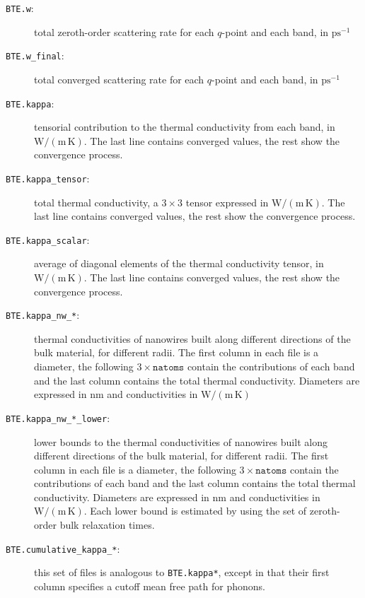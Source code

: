 \documentclass[a4paper,10pt,english]{article}
\begin{document}
\begin{description}
\item[\texttt{BTE.w}:] total zeroth-order scattering rate for each $q$-point and each band, in $\mathrm{ps^{-1}}$
\item[\texttt{BTE.w\_final}:] total converged scattering rate for each $q$-point and each band, in $\mathrm{ps^{-1}}$
\item[\texttt{BTE.kappa}:] tensorial contribution to the thermal conductivity from each band, in $\mathrm{W/\left(m\,K\right)}$. The last line contains converged values, the rest show the convergence process.
\item[\texttt{BTE.kappa\_tensor}:] total thermal conductivity, a $3\times 3$ tensor expressed in $\mathrm{W/\left(m\,K\right)}$. The last line contains converged values, the rest show the convergence process.
\item[\texttt{BTE.kappa\_scalar}:] average of diagonal elements of the thermal conductivity tensor, in $\mathrm{W/\left(m\,K\right)}$. The last line contains converged values, the rest show the convergence process.
\item[\texttt{BTE.kappa\_nw\_*}:] thermal conductivities of nanowires built along different directions of the bulk material, for different radii. The first column in each file is a diameter, the following $3\times\mathtt{natoms}$ contain the contributions of each band and the last column contains the total thermal conductivity. Diameters are expressed in $\mathrm{nm}$ and conductivities in $\mathrm{W/\left(m\,K\right)}$
\item[\texttt{BTE.kappa\_nw\_*\_lower}:] lower bounds to the thermal conductivities of nanowires built along different directions of the bulk material, for different radii. The first column in each file is a diameter, the following $3\times\mathtt{natoms}$ contain the contributions of each band and the last column contains the total thermal conductivity. Diameters are expressed in $\mathrm{nm}$ and conductivities in $\mathrm{W/\left(m\,K\right)}$. Each lower bound is estimated by using the set of zeroth-order bulk relaxation times.
\item[\texttt{BTE.cumulative\_kappa\_*}:] this set of files is analogous to \texttt{BTE.kappa*}, except in that their first column specifies a cutoff mean free path for phonons.
\end{description}
\end{document}
